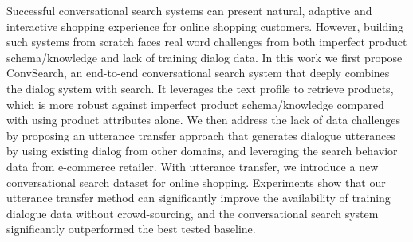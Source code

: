 Successful conversational search systems can present natural, adaptive and interactive shopping experience for online shopping customers. However, building such systems from scratch faces real word challenges from both imperfect product schema/knowledge and lack of training dialog data. In this work we first propose ConvSearch, an end-to-end conversational search system that deeply combines the dialog system with search. It leverages the text profile to retrieve products, which is more robust against imperfect product schema/knowledge compared with using product attributes alone. We then address the lack of data challenges by proposing an utterance transfer approach that generates dialogue utterances by using existing dialog from other domains, and leveraging the search behavior data from e-commerce retailer. With utterance transfer, we introduce a new conversational search dataset for online shopping. Experiments show that our utterance transfer method can significantly improve the availability of training dialogue data without crowd-sourcing, and the conversational search system significantly outperformed the best tested baseline.
